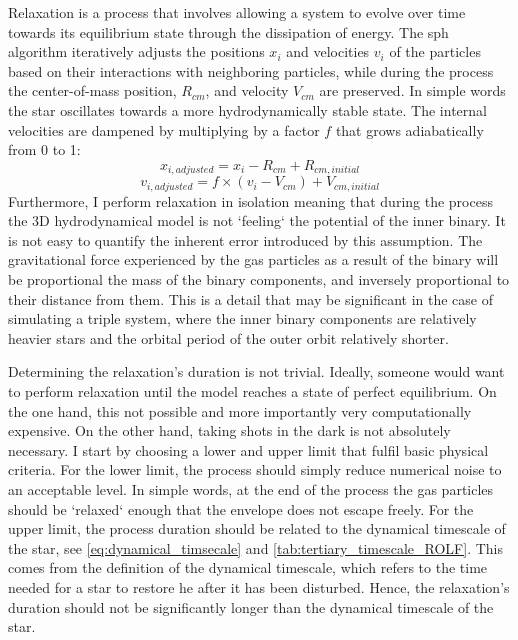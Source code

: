 Relaxation is a process that involves allowing a system to evolve over time towards its equilibrium state through the dissipation of energy. The \ac{sph} algorithm iteratively adjusts the positions $x_i$ and velocities $v_i$ of the particles based on their interactions with neighboring particles, while during the process the center-of-mass position, $R_{cm}$, and velocity $V_{cm}$ are preserved. In simple words the star oscillates towards a more hydrodynamically stable state. The internal velocities are dampened by multiplying by a factor $f$ that grows adiabatically from 0 to 1:
\begin{equation}\label{eq:adjust_positions}
    x_{i,adjusted} = x_i - R_{cm} + R_{cm,initial}
\end{equation}
\begin{equation}\label{eq:adjust_velocities}
    v_{i,adjusted} = f \times (v_i - V_{cm}) + V_{cm,initial}
\end{equation} 
Furthermore, I perform relaxation in isolation meaning that during the process the 3D hydrodynamical model is not `feeling` the potential of the inner binary. It is not easy to quantify the inherent error introduced by this assumption. The gravitational force experienced by the gas particles as a result of the binary will be proportional the mass of the binary components, and inversely proportional to their distance from them. This is a detail that may be significant in the case of simulating a triple system, where the inner binary components are relatively heavier stars and the orbital period of the outer orbit relatively shorter.

Determining the relaxation's duration is not trivial. Ideally, someone would want to perform relaxation until the model reaches a state of perfect equilibrium. On the one hand, this not possible and more importantly very computationally expensive. On the other hand, taking shots in the dark is not absolutely necessary. I start by choosing a lower and upper limit that fulfil basic physical criteria. For the lower limit, the process should simply reduce numerical noise to an acceptable level. In simple words, at the end of the process the gas particles should be `relaxed` enough that the envelope does not escape freely. For the upper limit, the process duration should be related to the dynamical timescale of the star, see \cref{eq:dynamical_timsecale} and \cref{tab:tertiary_timescale_ROLF}. This comes from the definition of the dynamical timescale, which refers to the time needed for a star to restore \ac{he} after it has been disturbed. Hence, the relaxation's duration should not be significantly longer than the dynamical timescale of the star. 

